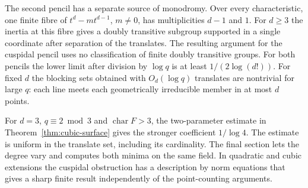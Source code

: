 \documentclass[preprint,12pt,numbers]{elsarticle}
\begin{document}
The second pencil has a separate source of monodromy. Over every
characteristic, one finite fibre of $t^d-mt^{d-1}$, $m\ne0$, has
multiplicities $d-1$ and $1$. For $d\ge3$ the inertia at this fibre
gives a doubly transitive subgroup supported in a single coordinate
after separation of the translates. The resulting argument for the
cuspidal pencil uses no classification of finite doubly transitive
groups. For both pencils the lower limit after division by $\log q$
is at least $1/(2\log(d!))$. For fixed $d$ the blocking sets obtained
with $O_d(\log q)$ translates are nontrivial for large $q$: each
line meets each geometrically irreducible member in at most $d$ points.

For $d=3$, $q\equiv2\bmod 3$ and $\operatorname{char}F>3$, the
two-parameter estimate in Theorem~\ref{thm:cubic-surface} gives the
stronger coefficient $1/\log4$. The estimate is uniform in the
translate set, including its cardinality. The final section lets the
degree vary and computes both minima on the same field. In quadratic
and cubic extensions the cuspidal obstruction has a description by
norm equations that gives a sharp finite result independently of the
point-counting arguments.
\end{document}

